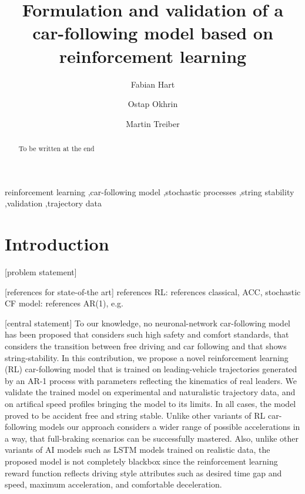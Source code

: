 \documentclass[review]{elsarticle}
\begin{document}
\begin{frontmatter}

\title{Formulation and validation of a car-following model based on
  reinforcement learning}


\author[firstAddress]{Fabian Hart}
\author[firstAddress,secondAddress]{Ostap Okhrin}
\author[firstAddress,secondAddress]{Martin Treiber}

\address[firstAddress]{TU Dresden}
\address[secondAddress]{Possible second address}




\begin{abstract}
To be written at the end
\end{abstract}

\begin{keyword}
reinforcement learning \sep car-following model \sep stochastic
processes \sep string stability \sep validation \sep trajectory data 
\end{keyword}

\end{frontmatter}


\section{Introduction}

[problem statement]

[references for state-of-the art]
references RL: \cite{farazi2020deep,qu2020jointly}
references classical, ACC, stochastic CF model: 
\cite{Opus,TreiberKesting-Book,Treiber2018stochIDM_TRB}
references AR(1), e.g. \cite{HonerkampEngl}


[central statement] To our knowledge, no neuronal-network car-following model has been proposed that considers such high safety and comfort standards, that considers the transition between free driving and car following and that shows string-stability.
In this contribution, we propose a novel reinforcement learning (RL)
car-following model that is trained on leading-vehicle trajectories
generated by an AR-1 process with parameters reflecting the kinematics of real
leaders. We validate the trained model on experimental and
naturalistic trajectory data, and on artifical speed profiles
bringing the model to its limits. In all cases, the model proved to be accident
free and  string stable. Unlike other variants of RL car-following models our approach considers a wider range of possible accelerations in a way, that full-braking scenarios can be successfully mastered. Also, unlike
other variants of AI models such as LSTM models trained on realistic data, the proposed model is
not completely blackbox since the reinforcement learning reward
function reflects driving style attributes such as desired time gap and
speed, maximum acceleration, and comfortable deceleration. 
\end{document}
